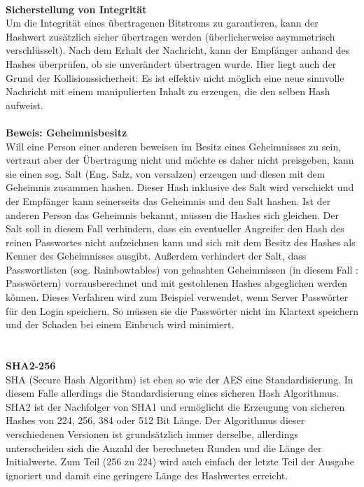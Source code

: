 \documentclass[13pt,a4paper,bibliography=totocnumbered,listof=totocnumbered]{scrartcl}
\begin{document}
\\\textbf{Sicherstellung von Integrität}\\
Um die Integrität eines übertragenen Bitstroms zu garantieren, kann der Hashwert zusätzlich sicher übertragen werden (überlicherweise asymmetrisch verschlüsselt). Nach dem Erhalt der Nachricht, kann der Empfänger anhand des Hashes überprüfen, ob sie unverändert übertragen wurde. Hier liegt auch der Grund der Kollisionssicherheit: Es ist effektiv nicht möglich eine neue sinnvolle Nachricht mit einem manipulierten Inhalt zu erzeugen, die den selben Hash aufweist.\\
\\\textbf{Beweis: Geheimnisbesitz}\\
Will eine Person einer anderen beweisen im Besitz eines Geheimnisses zu sein, vertraut aber der Übertragung nicht und möchte es daher nicht preisgeben, kann sie einen sog. Salt (Eng. Salz, von versalzen) erzeugen und diesen mit dem Geheimnis zusammen hashen. Dieser Hash inklusive des Salt wird verschickt und der Empfänger kann seinerseits das Geheimnis und den Salt hashen. Ist der anderen Person das Geheimnis bekannt, müssen die Hashes sich gleichen. Der Salt soll in diesem Fall verhindern, dass ein eventueller Angreifer den Hash des reinen Passwortes nicht aufzeichnen kann und sich mit dem Besitz des Hashes als Kenner des Geheimnisses ausgibt. Außerdem verhindert der Salt, dass Passwortlisten (sog. Rainbowtables) von gehashten Geheimnissen (in diesem Fall : Passwörtern) vorrausberechnet und mit gestohlenen Hashes abgeglichen werden können. Dieses Verfahren wird zum Beispiel verwendet, wenn Server Passwörter für den Login speichern. So müssen sie die Passwörter nicht im Klartext speichern und der Schaden bei einem Einbruch wird minimiert.\\
 \cite[S. 31ff]{48} \cite[S. 35f]{42}\\
\\\textbf{SHA2-256}\\
SHA (Secure Hash Algorithm) ist eben so wie der AES eine Standardisierung. In diesem Falle allerdings die Standardisierung eines sicheren Hash Algorithmus. SHA2 ist der Nachfolger von SHA1 und ermöglicht die Erzeugung von sicheren Hashes von 224, 256, 384 oder 512 Bit Länge. Der Algorithmus dieser verschiedenen Versionen ist grundsätzlich immer derselbe, allerdings unterscheiden sich die Anzahl der berechneten Runden und die Länge der Initialwerte. Zum Teil (256 zu 224) wird auch einfach der letzte Teil der Ausgabe ignoriert und damit eine geringere Länge des Hashwertes erreicht.\\
\cite[S. 5f]{13}\cite[S. 3, 7f, 10f]{10}
\pagebreak
\end{document}
